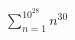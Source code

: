 \documentclass{standalone}
\begin{document}
$\displaystyle
    \sum_{n=1}^{10^{28}} n^{30}
$
\end{document}
